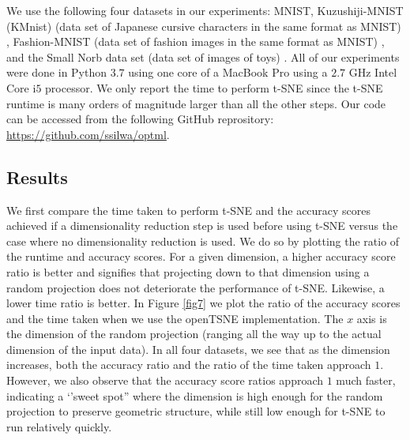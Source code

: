 \documentclass[12pt]{opt2019} %
\begin{document}
We use the following four datasets in our experiments: MNIST, Kuzushiji-MNIST (KMnist) (data set of Japanese cursive characters in the same format as MNIST) \cite{kmnist}, Fashion-MNIST (data set of fashion images in the same format as MNIST) \cite{fashionmnist}, and the Small Norb data set (data set of images of toys) \cite{smallnorb}. All of our experiments were done in Python $3.7$ using one core of a MacBook Pro using a $2.7$ GHz Intel Core i$5$ processor. We only report the time to perform t-SNE since the t-SNE runtime is many orders of magnitude larger than all the other steps. Our code can be accessed from the following GitHub reprository: \url{https://github.com/ssilwa/optml}. 

\subsection{Results}\label{sec:actualresults}
We first compare the time taken to perform t-SNE and the accuracy scores achieved if a dimensionality reduction step is used before using t-SNE versus the case where no dimensionality reduction is used. We do so by plotting the ratio of the runtime and accuracy scores. For a given dimension, a higher accuracy score ratio is better and signifies that projecting down to that dimension using a random projection does not deteriorate the performance of t-SNE. Likewise, a lower time ratio is better. In Figure \ref{fig7} we plot the ratio of the accuracy scores and the time taken when we use the openTSNE implementation. The $x$ axis is the dimension of the random projection (ranging all the way up to the actual dimension of the input data). In all four datasets, we see that as the dimension increases, both the accuracy ratio and the ratio of the time taken approach $1$. However, we also observe that the accuracy score ratios approach $1$ much faster, indicating a ‘’sweet spot” where the dimension is high enough for the random projection to preserve geometric structure, while still low enough for t-SNE to run relatively quickly.
\end{document}
